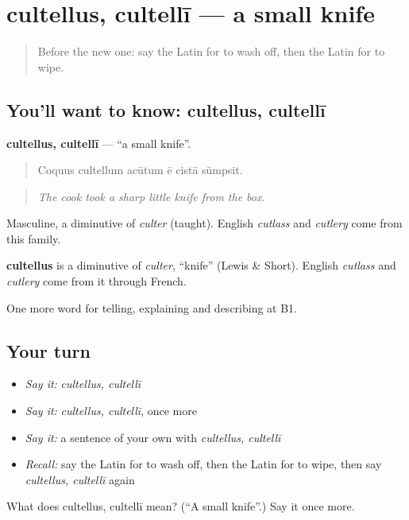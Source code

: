 \section[cultellus, cultellī]{cultellus, cultellī — a small knife}

\label{lesson:LA-C350-cultellus}



\begin{quote}
Before the new one: say the Latin for to wash off, then the Latin for to wipe.
\end{quote}

\subsection*{You'll want to know: cultellus, cultellī}
\textbf{cultellus, cultellī} — \textquotedblleft{}a small knife\textquotedblright{}.

\begin{quote}
Coquus cultellum acūtum ē cistā sūmpsit.
\end{quote}

\begin{quote}
\emph{The cook took a sharp little knife from the box.}
\end{quote}

Masculine, a diminutive of \emph{culter} (taught). English \emph{cutlass} and \emph{cutlery} come from this family.

\begin{cousinweb}
\textbf{cultellus} is a diminutive of \emph{culter}, \textquotedblleft{}knife\textquotedblright{} (Lewis \& Short). English \emph{cutlass} and \emph{cutlery} come from it through French.
\end{cousinweb}

\begin{grammarlens}[title={What you've built}]
One more word for telling, explaining and describing at B1.
\end{grammarlens}

\subsection*{Your turn}
\begin{itemize}
\raggedright
  \item \emph{Say it:} \emph{cultellus, cultellī}
  \item \emph{Say it:} \emph{cultellus, cultellī}, once more
  \item \emph{Say it:} a sentence of your own with \emph{cultellus, cultellī}
  \item \emph{Recall:} say the Latin for to wash off, then the Latin for to wipe, then say \emph{cultellus, cultellī} again
\end{itemize}

\begin{tcolorbox}[breakable,colback=teal!4,colframe=teal!35!black,title={Before you move on}]
What does cultellus, cultellī mean? (\textquotedblleft{}A small knife\textquotedblright{}.) Say it once more.
\end{tcolorbox}
